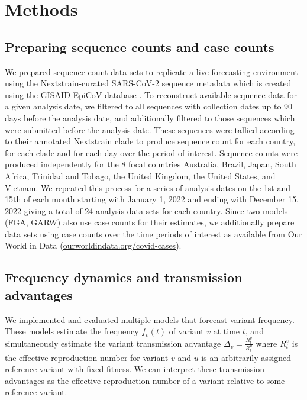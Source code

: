 \documentclass[10pt,letterpaper]{article}
\begin{document}
\section*{Methods}

\subsection*{Preparing sequence counts and case counts}

We prepared sequence count data sets to replicate a live forecasting environment using the Nextstrain-curated SARS-CoV-2 sequence metadata \cite{hadfield2018nextstrain} which is created using the GISAID EpiCoV database \cite{khare2021gisaid}.
To reconstruct available sequence data for a given analysis date, we filtered to all sequences with collection dates up to 90 days before the analysis date, and additionally filtered to those sequences which were submitted before the analysis date.
These sequences were tallied according to their annotated Nextstrain clade to produce sequence count for each country, for each clade and for each day over the period of interest.
Sequence counts were produced independently for the 8 focal countries Australia, Brazil, Japan, South Africa, Trinidad and Tobago, the United Kingdom, the United States, and Vietnam.
We repeated this process for a series of analysis dates on the 1st and 15th of each month starting with January 1, 2022 and ending with December 15, 2022 giving a total of 24 analysis data sets for each country.
Since two models (FGA, GARW) also use case counts for their estimates, we additionally prepare data sets using case counts over the time periods of interest as available from Our World in Data (\href{https://ourworldindata.org/covid-cases}{ourworldindata.org/covid-cases}).

\subsection*{Frequency dynamics and transmission advantages}

We implemented and evaluated multiple models that forecast variant frequency.
These models estimate the frequency $f_{v}(t)$ of variant $v$ at time $t$, and simultaneously estimate the variant transmission advantage $\Delta_{v} = \frac{R_{t}^{v}}{R_{t}^{u}}$ where $R_{t}^{v}$ is the effective reproduction number for variant $v$ and $u$ is an arbitrarily assigned reference variant with fixed fitness.
We can interpret these transmission advantages as the effective reproduction number of a variant relative to some reference variant.
\end{document}
